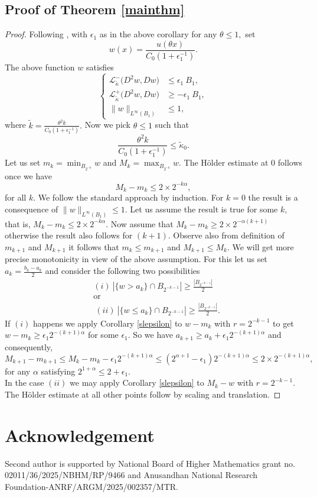\documentclass{amsart}
\theoremstyle{plain}
\numberwithin{equation}{section}
\begin{document}
\subsection{Proof of Theorem \ref{mainthm}}
\begin{proof}
Following \cite{imbert2016estimates}, with $\epsilon_{1}$ as in the above corollary for any $\theta\leq 1,$ set 
\[w(x)=\frac{u(\theta x)}{C_{0}(1+\epsilon_{1}^{-1})}.\]
The above function $w$ satisfies
\begin{equation*}
\left\{
\begin{aligned}
\mathcal{L}_{\tilde{\kappa}}^{-}\big(D^{2}w,Dw\big)&\leq \epsilon_{1}~B_{1},\\ 
\mathcal{L}_{\tilde{\kappa}}^{+}\big(D^{2}w,Dw\big)&\geq-\epsilon_{1}~B_{1},\\
\|w\|_{L^{\infty}(B_{1})}&\leq 1,
\end{aligned}
\right.
\end{equation*}
where $\tilde{k}=\frac{\theta^{2}k}{C_{0}(1+\epsilon^{-1}_{1})}.$ Now we pick $\theta\leq 1$ such that 
\[\frac{\theta^{2}k}{C_{0}(1+\epsilon^{-1}_{1})}\leq \tilde{\kappa}_{0}.\]
Let us set $m_{k}=\min_{B_{2^{-k}}}w$ and $M_{k}=\max_{B_{2^{-k}}}w.$ The H\"{o}lder estimate at $0$ follows once we have 
\[M_{k}-m_{k}\leq 2\times 2^{-k\alpha},\]
for all $k.$ We follow the standard approach by induction. For $k=0$ the result is a consequence of $\|w\|_{L^{\infty}(B_{1})}\leq 1.$ Let us assume the result is true for some $k,$ that is, $M_{k}-m_{k}\leq 2\times 2^{-k\alpha}.$ Now assume that $M_{k}-m_{k}\geq 2\times 2^{-\alpha(k+1)}$ otherwise the result also follows for $(k+1).$ Observe also from definition of $m_{k+1}$ and $M_{k+1}$ it follows that $m_{k}\leq m_{k+1}$ and $M_{k+1}\leq M_{k}.$ We will get more precise monotonicity in view of the above assumption. For this let us set $a_{k}=\frac{b_{k}-a_{k}}{2}$ and consider the following two possibilities
\begin{equation*}
\begin{aligned}
&(i)~|\{w>a_{k}\}\cap B_{2^{-k-1}}|\geq\frac{|B_{2^{-k-1}}|}{2}\\
&\text{or}\\
&~(ii)~|\{w\leq a_{k}\}\cap B_{2^{-k-1}}|\geq\frac{|B_{2^{-k-1}}|}{2}.
\end{aligned}
\end{equation*}
 If $(i)$ happens we apply Corollary \ref{slepsilon} to $w-m_{k}$ with $r=2^{-k-1}$ to get $w-m_{k}\geq \epsilon_{1}2^{-(k+1)\alpha}$ for some $\epsilon_{1}.$ So we have $a_{k+1}\geq a_{k}+\epsilon_{1} 2^{-(k+1)\alpha}$ and consequently,
 \[M_{k+1}-m_{k+1}\leq M_{k}-m_{k}-\epsilon_{1}2^{-(k+1)\alpha}\leq (2^{\alpha+1}-\epsilon_{1})2^{-(k+1)\alpha}\leq 2\times 2^{-(k+1)\alpha},\]
 for any $\alpha$ satisfying $2^{1+\alpha}\leq 2+\epsilon_{1}.$\\ In the case $(ii)$ we may apply Corollary \ref{slepsilon} to $M_{k}-w$ with $r=2^{-k-1}.$ The H\"{o}lder estimate at all other points follow by scaling and translation.
\end{proof}

\section{Acknowledgement}
Second author is supported by National Board of Higher Mathematics grant no. 02011/36/2025/NBHM/RP/9466 and Anusandhan National Research Foundation-ANRF/ARGM/2025/002357/MTR.


\end{document}
